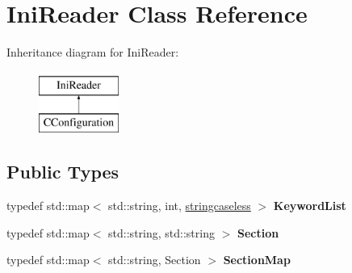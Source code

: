 \hypertarget{class_ini_reader}{
\section{IniReader Class Reference}
\label{class_ini_reader}
}
Inheritance diagram for IniReader:\begin{figure}[H]
\begin{center}
\leavevmode
\includegraphics[height=2cm]{class_ini_reader}
\end{center}
\end{figure}
\subsection*{Public Types}
\begin{DoxyCompactItemize}
\item 
\hypertarget{class_ini_reader_afabde1f4105b0d5b0c131d29131add37}{
typedef std::map$<$ std::string, int, \hyperlink{structstringcaseless}{stringcaseless} $>$ {\bfseries KeywordList}}
\label{class_ini_reader_afabde1f4105b0d5b0c131d29131add37}

\item 
\hypertarget{class_ini_reader_aae1efaf11228bffb3fdbbe6df4141c63}{
typedef std::map$<$ std::string, std::string $>$ {\bfseries Section}}
\label{class_ini_reader_aae1efaf11228bffb3fdbbe6df4141c63}

\item 
\hypertarget{class_ini_reader_a68b3659daa175cd1b5f7dd0dd026a871}{
typedef std::map$<$ std::string, Section $>$ {\bfseries SectionMap}}
\label{class_ini_reader_a68b3659daa175cd1b5f7dd0dd026a871}

\end{DoxyCompactItemize}
